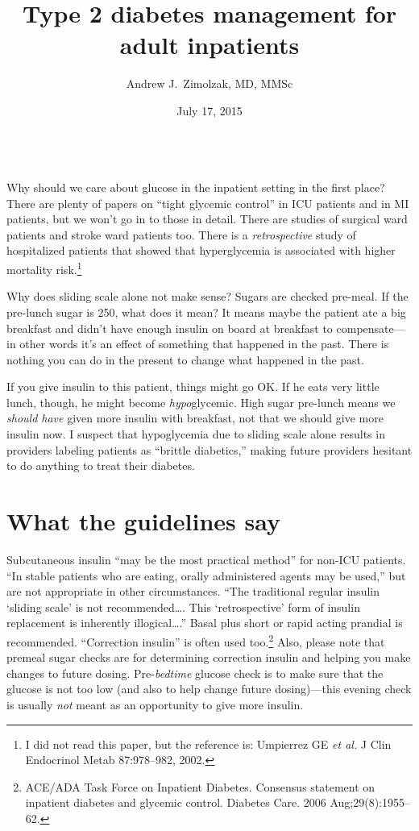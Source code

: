 \documentclass{tufte-handout}
\title{Type 2 diabetes management for adult inpatients}
\author{Andrew J.\ Zimolzak, MD, MMSc}
\date{July 17, 2015}
\begin{document}
\maketitle

~\\ %

Why should we care about glucose in the inpatient setting in the first
place? There are plenty of papers on ``tight glycemic control'' in ICU
patients and in MI patients, but we won't go in to those in
detail. There are studies of surgical ward patients and stroke ward
patients too. There is a \emph{retrospective} study of hospitalized
patients that showed that hyperglycemia is associated with higher
mortality risk.\footnote{I did not read this paper, but the reference
  is: Umpierrez GE \emph{et al.} J Clin Endocrinol Metab 87:978--982,
  2002.}

Why does sliding scale alone not make sense? Sugars are checked
pre-meal. If the pre-lunch sugar is 250, what does it mean? It means
maybe the patient ate a big breakfast and didn't have enough insulin
on board at breakfast to compensate---in other words it's an effect
of something that happened in the past. There is nothing you can do in
the present to change what happened in the past.

If you give insulin to this patient, things might go OK. If he eats
very little lunch, though, he might become \emph{hypo}glycemic. High
sugar pre-lunch means we \emph{should have} given more insulin with
breakfast, not that we should give more insulin now. I suspect that
hypoglycemia due to sliding scale alone results in providers labeling
patients as ``brittle diabetics,'' making future providers hesitant to
do anything to treat their diabetes.

\section{What the guidelines say}

Subcutaneous insulin ``may be the most practical method'' for non-ICU
patients. ``In stable patients who are eating, orally administered
agents may be used,'' but are not appropriate in other
circumstances. ``The traditional regular insulin `sliding scale' is
not recommended\ldots{}. This `retrospective' form of insulin
replacement is inherently illogical\ldots{}.'' Basal plus short or
rapid acting prandial is recommended. ``Correction insulin'' is often
used too.\footnote{ACE/ADA Task Force on Inpatient Diabetes. Consensus
  statement on inpatient diabetes and glycemic control. Diabetes
  Care. 2006 Aug;29(8):1955--62.} Also, please note that premeal sugar
checks are for determining correction insulin and helping you make
changes to future dosing. Pre-\emph{bedtime} glucose check is to make
sure that the glucose is not too low (and also to help change future
dosing)---this evening check is usually \emph{not} meant as an
opportunity to give more insulin.
\end{document}
